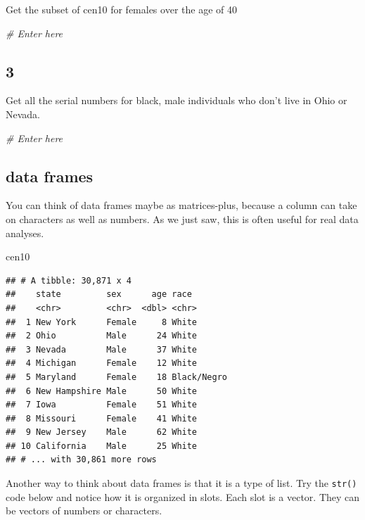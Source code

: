 \documentclass[]{book}
\newenvironment{Shaded}{\begin{snugshade}}{\end{snugshade}}
\newcommand{\CommentTok}[1]{\textcolor[rgb]{0.56,0.35,0.01}{\textit{#1}}}
\newcommand{\NormalTok}[1]{#1}
\theoremstyle{definition}
\theoremstyle{definition}
\theoremstyle{definition}
\theoremstyle{remark}
\begin{document}
Get the subset of cen10 for females over the age of 40

\begin{Shaded}
\begin{Highlighting}[]
\CommentTok{# Enter here}
\end{Highlighting}
\end{Shaded}

\subsection*{3}\label{section-8}

Get all the serial numbers for black, male individuals who don't live in
Ohio or Nevada.

\begin{Shaded}
\begin{Highlighting}[]
\CommentTok{# Enter here}
\end{Highlighting}
\end{Shaded}

\subsection{data frames}\label{data-frames}

You can think of data frames maybe as matrices-plus, because a column
can take on characters as well as numbers. As we just saw, this is often
useful for real data analyses.

\begin{Shaded}
\begin{Highlighting}[]
\NormalTok{cen10}
\end{Highlighting}
\end{Shaded}

\begin{verbatim}
## # A tibble: 30,871 x 4
##    state         sex      age race       
##    <chr>         <chr>  <dbl> <chr>      
##  1 New York      Female     8 White      
##  2 Ohio          Male      24 White      
##  3 Nevada        Male      37 White      
##  4 Michigan      Female    12 White      
##  5 Maryland      Female    18 Black/Negro
##  6 New Hampshire Male      50 White      
##  7 Iowa          Female    51 White      
##  8 Missouri      Female    41 White      
##  9 New Jersey    Male      62 White      
## 10 California    Male      25 White      
## # ... with 30,861 more rows
\end{verbatim}

Another way to think about data frames is that it is a type of list. Try
the \texttt{str()} code below and notice how it is organized in slots.
Each slot is a vector. They can be vectors of numbers or characters.
\end{document}
